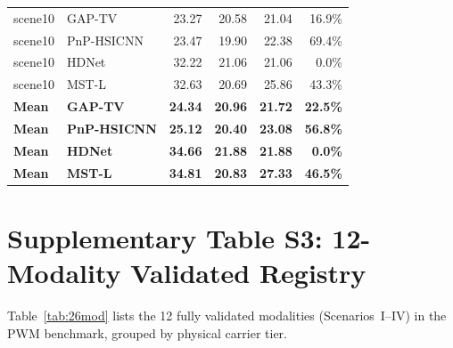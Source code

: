 \documentclass[11pt]{article}
\theoremstyle{definition}
\begin{document}
\begin{footnotesize}
\begin{longtable}{l l r r r r}
\midrule
scene10 & GAP-TV        & 23.27 & 20.58 & 21.04 & 16.9\% \\
scene10 & PnP-HSICNN    & 23.47 & 19.90 & 22.38 & 69.4\% \\
scene10 & HDNet         & 32.22 & 21.06 & 21.06 & 0.0\% \\
scene10 & MST-L         & 32.63 & 20.69 & 25.86 & 43.3\% \\
\midrule
\textbf{Mean} & \textbf{GAP-TV}     & \textbf{24.34} & \textbf{20.96} & \textbf{21.72} & \textbf{22.5\%} \\
\textbf{Mean} & \textbf{PnP-HSICNN} & \textbf{25.12} & \textbf{20.40} & \textbf{23.08} & \textbf{56.8\%} \\
\textbf{Mean} & \textbf{HDNet}      & \textbf{34.66} & \textbf{21.88} & \textbf{21.88} & \textbf{0.0\%} \\
\textbf{Mean} & \textbf{MST-L}      & \textbf{34.81} & \textbf{20.83} & \textbf{27.33} & \textbf{46.5\%} \\
\end{longtable}
\end{footnotesize}

\newpage

\section{Supplementary Table S3: 12-Modality Validated Registry}
\label{sec:26mod}

Table~\ref{tab:26mod} lists the 12 fully validated modalities (Scenarios~I--IV)
in the PWM benchmark, grouped by physical carrier tier.
\end{document}
